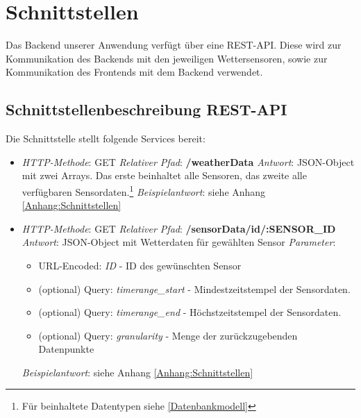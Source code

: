 

\section{Schnittstellen}\label{Schnittstellen}
Das Backend unserer Anwendung verfügt über eine REST-API. Diese wird zur Kommunikation des Backends mit den jeweiligen Wettersensoren, sowie zur Kommunikation des Frontends mit dem Backend verwendet.

\subsection*{Schnittstellenbeschreibung REST-API}\label{schnittstellen:rest}
Die Schnittstelle stellt folgende Services bereit:

\begin{itemize}
    \item \textsl{HTTP-Methode}: GET
    \subitem \textsl{Relativer Pfad}: \textbf{/weatherData}
    \subitem \textsl{Antwort}: JSON-Object mit zwei Arrays.
    Das erste beinhaltet alle Sensoren, das zweite alle verfügbaren Sensordaten.\footnote{Für beinhaltete Datentypen siehe \cref{Datenbankmodell}}%
    \subitem \textsl{Beispielantwort}: siehe Anhang \ref{Anhang:Schnittstellen}
\end{itemize}

\begin{itemize}
    \item \textsl{HTTP-Methode}: GET
    \subitem \textsl{Relativer Pfad}: \textbf{/sensorData/id/:SENSOR\_ID}
    \subitem \textsl{Antwort}: JSON-Object mit Wetterdaten für gewählten Sensor
    \subitem \textsl{Parameter}: \begin{itemize}
                                     \item URL-Encoded: \textit{ID} - ID des gewünschten Sensor
                                     \item (optional) Query:    \textit{timerange\_start} - Mindestzeitstempel der Sensordaten.
                                     \item (optional) Query:    \textit{timerange\_end} - Höchstzeitstempel der Sensordaten.
                                     \item (optional) Query: \textit{granularity} - Menge der zurückzugebenden Datenpunkte
    \end{itemize}
    \subitem \textsl{Beispielantwort}: siehe Anhang \ref{Anhang:Schnittstellen}
\end{itemize}

